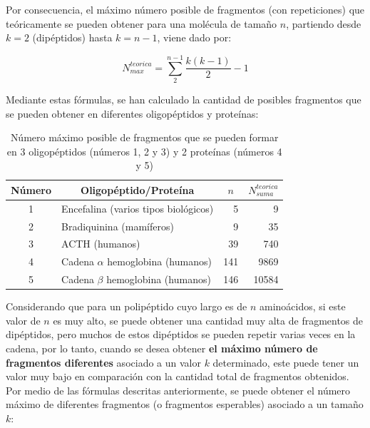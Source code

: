 Por consecuencia, el máximo número posible de fragmentos (con repeticiones) que teóricamente se pueden obtener para una molécula de tamaño $n$, partiendo desde $k=2$ (dipéptidos) hasta $k=n-1$, viene dado por:

\begin{equation}
N_{max}^{teorica}=\sum_{2}^{n-1} \frac{k(k-1)}{2}-1
\end{equation}

Mediante estas fórmulas, se han calculado la cantidad de posibles fragmentos que se pueden obtener en diferentes oligopéptidos y proteínas:

\begin{table}[H]
\centering
\label{my-label3}
\begin{tabular}{|c|l|r|r|}
\hline
Número & \multicolumn{1}{c|}{Oligopéptido/Proteína} & \multicolumn{1}{c|}{$n$} & \multicolumn{1}{c|}{$N_{suma}^{teorica}$} \\ \hline
1      & Encefalina (varios tipos biológicos)       & 5                        & 9                     \\
2      & Bradiquinina (mamíferos)                   & 9                        & 35                    \\
3      & ACTH (humanos)                             & 39                       & 740                   \\
4      & Cadena $\alpha$ hemoglobina (humanos)          & 141                      & 9869                  \\
5      & Cadena $\beta$ hemoglobina (humanos)          & 146                      & 10584                 \\ \hline
\end{tabular}
\caption{Número máximo posible de fragmentos que se pueden formar en 3 oligopéptidos (números 1, 2 y 3) y 2 proteínas (números 4 y 5)}
\end{table}

Considerando que para un polipéptido cuyo largo es de $n$ aminoácidos, si este valor de $n$ es muy alto, se puede obtener una cantidad muy alta de fragmentos de dipéptidos, pero muchos de estos dipéptidos se pueden repetir varias veces en la cadena, por lo tanto, cuando se desea obtener {\bf{el máximo número de fragmentos diferentes}} asociado a un valor $k$ determinado, este puede tener un valor muy bajo en comparación con la cantidad total de fragmentos obtenidos. Por medio de las fórmulas descritas anteriormente, se puede obtener el número máximo de diferentes fragmentos (o fragmentos esperables) asociado a un tamaño $k$:

